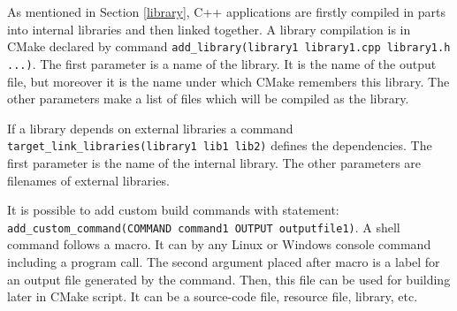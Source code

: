 As mentioned in Section \ref{library}, C++ applications are firstly compiled in parts into internal libraries and then linked together. A library compilation is in CMake declared by command \texttt{add\-\_library\-(library1 library1.cpp library1.h ...)}. The first parameter is a name of the library. It is the name of the output file, but moreover it is the name under which CMake remembers this library. The other parameters make a list of files which will be compiled as the library.

If a library depends on external libraries a command \texttt{target\-\_link\-\_libraries\-(library1 lib1 lib2)} defines the dependencies. The first parameter is the name of the internal library. The other parameters are filenames of external libraries.

It is possible to add custom build commands with statement: {\tt add\-\_custom\-\_command\-(COMMAND command1 OUTPUT outputfile1)}. A shell command follows a  macro. It can by any Linux or Windows console command including a program call. The second argument placed after  macro is a label for an output file generated by the command. Then, this file can be used for building later in CMake script. It can be a source-code file, resource file, library, etc.





